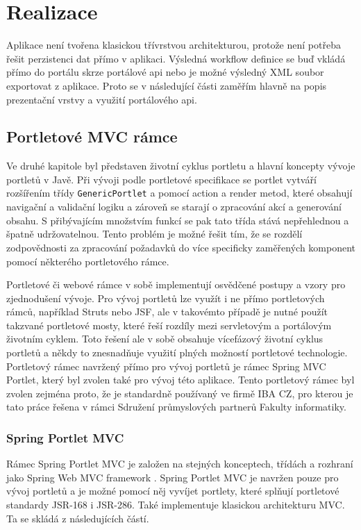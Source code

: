 \documentclass{fithesis}
\begin{document}
\begin{center}
\begin{longtable}{|p{5.5cm}|p{5.5cm}|}
\end{longtable}
\end{center}



\chapter{Realizace}
Aplikace není tvořena klasickou třívrstvou architekturou, protože není potřeba řešit perzistenci dat přímo v aplikaci. Výsledná workflow definice se buď vkládá přímo do portálu skrze portálové api nebo je možné výsledný XML soubor exportovat z aplikace. Proto se v následující části zaměřím hlavně na popis prezentační vrstvy a využití portálového api.

\section{Portletové MVC rámce}
Ve druhé kapitole byl představen životní cyklus portletu a hlavní koncepty vývoje portletů v Javě. Při vývoji podle portletové specifikace se portlet vytváří rozšířením třídy  \verb|GenericPortlet| a pomocí action a render metod, které obsahují navigační a validační logiku a zároveň se starají o zpracování akcí a generování obsahu. S přibývajícím množstvím funkcí se pak tato třída stává nepřehlednou a špatně udržovatelnou. Tento problém je možné řešit tím, že se rozdělí zodpovědnosti za zpracování požadavků do více specificky zaměřených komponent pomocí některého portletového rámce.

Portletové či webové rámce v sobě implementují osvědčené postupy a vzory pro zjednodušení vývoje. Pro vývoj portletů lze využít i ne přímo portletových rámců, například Struts nebo JSF, ale v takovémto případě je nutné použít takzvané portletové mosty, které řeší rozdíly mezi servletovým a portálovým životním cyklem. Toto řešení ale v sobě obsahuje vícefázový životní cyklus portletů a někdy to znesnadňuje využití plných možností portletové technologie. Portletový rámec navržený přímo pro vývoj portletů je rámec Spring MVC Portlet, který byl zvolen také pro vývoj této aplikace. Tento portletový rámec byl zvolen zejména proto, že je standardně používaný ve firmě IBA CZ, pro kterou je tato práce řešena v rámci Sdružení průmyslových partnerů Fakulty informatiky.

\subsection{Spring Portlet MVC}
Rámec Spring Portlet MVC je založen na stejných konceptech, třídách a rozhraní jako Spring Web MVC framework \cite{spring-web-mvc}. Spring Portlet MVC je navržen pouze pro vývoj portletů a je možné pomocí něj vyvíjet portlety, které splňují portletové standardy JSR-168 i JSR-286. Také implementuje klasickou architekturu MVC. Ta se skládá z následujících částí. \cite{mvc} 
\end{document}
